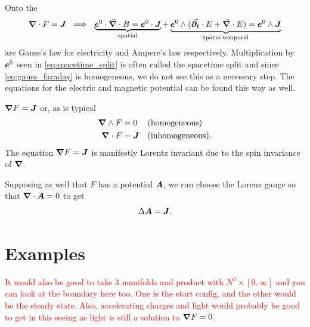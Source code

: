 \documentclass{article}
\begin{document}
Onto the 
\begin{align}
\label{eq:spacetime_split}
	\boldsymbol{\nabla} \cdot F=\boldsymbol{J}~\implies~ \underbrace{\boldsymbol{e}^0 \cdot \vec{\boldsymbol{\nabla}} \cdot B = \boldsymbol{e}^0 \cdot \boldsymbol{J}}_{\textrm{spatial}} +  \underbrace{\boldsymbol{e}^0 \wedge (\vec{\boldsymbol{\partial_t}} \cdot E + \vec{\boldsymbol{\nabla}} \cdot E) = \boldsymbol{e}^0 \wedge \boldsymbol{J}}_{\textrm{spatio-temporal}}
\end{align}
are Gauss's law for electricity and Ampere's law respectively. Multiplication by $\boldsymbol{e}^0$ seen in \cref{eq:spacetime_split} is often called the spacetime split and since \cref{eq:gauss_faraday} is homogeneous, we do not see this as a necessary step. The equations for the electric and magnetic potential can be found this way as well.


$\boldsymbol{\nabla} F = \boldsymbol{J}$ or, as is typical
\begin{align}
	\boldsymbol{\nabla} \wedge F &= 0  &&\textrm{(homogeneous)}\\
	\boldsymbol{\nabla} \cdot F &= \boldsymbol{J} && \textrm{(inhomogeneous)}.
\end{align}
The equation $\boldsymbol{\nabla} F = \boldsymbol{J}$ is manifestly Lorentz invariant due to the spin invariance of $\boldsymbol{\nabla}$. 

Supposing as well that $F$ has a potential $\boldsymbol{A}$, we can choose the Lorenz gauge so that $\boldsymbol{\nabla} \cdot \boldsymbol{A} = 0$ to get
\begin{equation}
\Delta \boldsymbol{A} = \boldsymbol{J}.
\end{equation}





\section{Examples}

\textcolor{red}{It would also be good to take 3 manifolds and product with $N^3 \times [0,\infty]$ and you can look at the boundary here too. One is the start config, and the other would be the steady state. Also, accelerating charges and light would probably be good to get in this seeing as light is still a solution to $\boldsymbol{\nabla} F=0$.}
\end{document}
